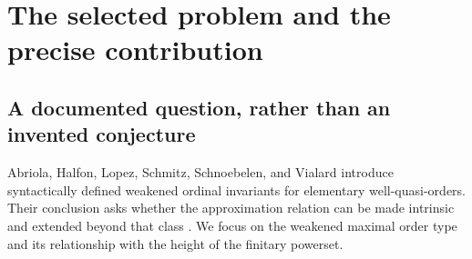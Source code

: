 \documentclass[11pt,letterpaper]{article}
\theoremstyle{teal}
\theoremstyle{definition}
\newcommand{\Pf}{\mathsf P_{\!f}}
\newcommand{\Idl}{\operatorname{Idl}}
\newcommand{\Comp}{\operatorname{K}}
\newcommand{\hgt}{\operatorname{h}}
\newcommand{\mot}{\operatorname{o}}
\newcommand{\ao}{\mathfrak a_o}
\newcommand{\emb}{\hookrightarrow}
\newcommand{\MR}{\mathbin{\odot}}
\newcommand{\rank}{\operatorname{rk}}
\newcommand{\up}{\mathord\uparrow}
\begin{document}
\begin{abstract}
The height of a finitary powerset can be sensitive to details of a well-partial-order that its usual ordinal invariants do not retain. Motivated by a published question about replacing syntactic approximations with intrinsic ones, define
\[
 \ao(A)=\sup\{\mot(B)+1:\Idl(B)\emb A\},
\]
where $B$ ranges over well-partial-orders and $\Idl(B)$ is the poset of nonempty directed downsets. We prove $\ao(A)\leq\hgt(\Pf(A))$ for every well-partial-order. Equality holds whenever each finite subset of $A$ is contained in a downward-closed subposet isomorphic to an ideal completion. This locality condition is equivalent to every finitely generated downset being an algebraic directed-complete poset; it yields the pointwise formula $\rank_{\Pf(A)}(D)=\mot(\Comp(D))$.

The locality condition is preserved by finite disjoint unions, Cartesian products, finite words, finite multisets under injective embedding, and finitary Hoare powersets. It holds for all ordinal chains and finite posets. Thus the invariant is intrinsic and agrees with the published weakened maximal order type on elementary well-quasi-orders. For products of arbitrary ordinal chains we obtain an exact supremum formula; for powers of $\omega$ it reduces to $\omega^{\beta_1\MR\cdots\MR\beta_d}$, with $\MR$ the Milner--Rado sum. Mixed endpoint variants give the same numerical values as certain known topological pigeonhole numbers.

The unrestricted equality is false. For an infinite limit ordinal $\lambda$ and a nonempty finite poset $F$, we prove $\ao(\lambda+F)=\lambda+\max_{x\in F}|\up_Fx|$ while $\hgt(\Pf(\lambda+F))=\lambda+|F|$. Equality holds exactly when $F$ has a least element. This refutes a natural extension proposed in this note, not a conjecture asserted in the source paper.
\end{abstract}
\tableofcontents
\newpage

\section{The selected problem and the precise contribution}
\subsection{A documented question, rather than an invented conjecture}
Abriola, Halfon, Lopez, Schmitz, Schnoebelen, and Vialard introduce syntactically defined weakened ordinal invariants for elementary well-quasi-orders. Their conclusion asks whether the approximation relation can be made intrinsic and extended beyond that class \cite[Section~6]{AHLLSSV}. We focus on the weakened maximal order type and its relationship with the height of the finitary powerset.
\end{document}
